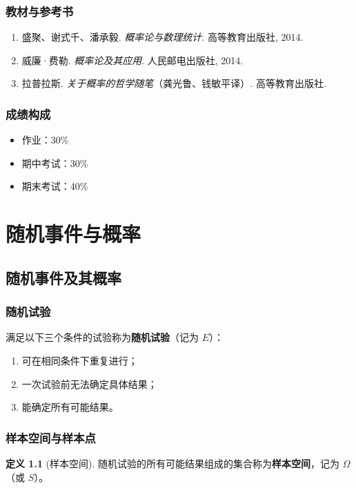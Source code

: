 \documentclass[11pt,a4paper]{report}
\theoremstyle{definition}
\newtheorem{definition}{定义}[chapter]
\begin{document}
\subsection{教材与参考书}
\begin{enumerate}[leftmargin=2em]
    \item 盛聚、谢式千、潘承毅. \textit{概率论与数理统计}. 高等教育出版社, 2014.
    \item 威廉·费勒. \textit{概率论及其应用}. 人民邮电出版社, 2014.
    \item 拉普拉斯. \textit{关于概率的哲学随笔}（龚光鲁、钱敏平译）. 高等教育出版社.
\end{enumerate}

\subsection{成绩构成}
\begin{itemize}[leftmargin=2em]
    \item 作业：30\%
    \item 期中考试：30\%
    \item 期末考试：40\%
\end{itemize}

\newpage
\chapter{随机事件与概率}

\section{随机事件及其概率}

\subsection{随机试验}
满足以下三个条件的试验称为\textbf{随机试验}（记为 $E$）：
\begin{enumerate}[leftmargin=2em]
    \item 可在相同条件下重复进行；
    \item 一次试验前无法确定具体结果；
    \item 能确定所有可能结果。
\end{enumerate}

\subsection{样本空间与样本点}
\begin{definition}[样本空间]
随机试验的所有可能结果组成的集合称为\textbf{样本空间}，记为 $\Omega$（或 $S$）。
\end{definition}
\end{document}
